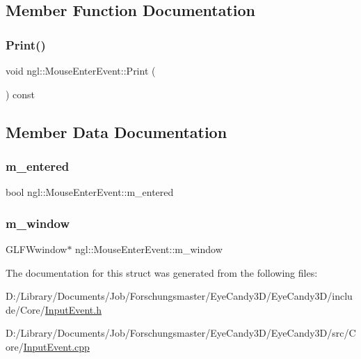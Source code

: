 \subsection{Member Function Documentation}
\mbox{\label{structngl_1_1_mouse_enter_event_abc7fedebbc99bc6294d89e69a259557f}} 
\subsubsection{\texorpdfstring{Print()}{Print()}}
{\footnotesize\ttfamily void ngl\+::\+Mouse\+Enter\+Event\+::\+Print (\begin{DoxyParamCaption}{ }\end{DoxyParamCaption}) const}



\subsection{Member Data Documentation}
\mbox{\label{structngl_1_1_mouse_enter_event_a714b8059fc11073b4a90faa31a0dfbe4}} 
\subsubsection{\texorpdfstring{m\+\_\+entered}{m\_entered}}
{\footnotesize\ttfamily bool ngl\+::\+Mouse\+Enter\+Event\+::m\+\_\+entered}

\mbox{\label{structngl_1_1_mouse_enter_event_a2f2ea0500ef1f87f1eb70f1b481d741b}} 
\subsubsection{\texorpdfstring{m\+\_\+window}{m\_window}}
{\footnotesize\ttfamily G\+L\+F\+Wwindow$\ast$ ngl\+::\+Mouse\+Enter\+Event\+::m\+\_\+window}



The documentation for this struct was generated from the following files\+:\begin{DoxyCompactItemize}
\item 
D\+:/\+Library/\+Documents/\+Job/\+Forschungsmaster/\+Eye\+Candy3\+D/\+Eye\+Candy3\+D/include/\+Core/\mbox{\hyperlink{_input_event_8h}{Input\+Event.\+h}}\item 
D\+:/\+Library/\+Documents/\+Job/\+Forschungsmaster/\+Eye\+Candy3\+D/\+Eye\+Candy3\+D/src/\+Core/\mbox{\hyperlink{_input_event_8cpp}{Input\+Event.\+cpp}}\end{DoxyCompactItemize}
